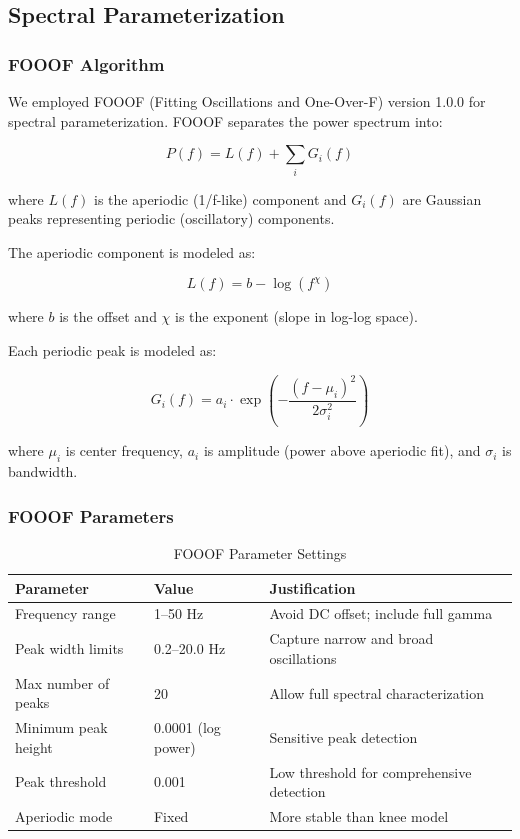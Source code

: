\documentclass[11pt,a4paper]{article}
\begin{document}
\subsection{Spectral Parameterization}

\subsubsection{FOOOF Algorithm}

We employed FOOOF (Fitting Oscillations and One-Over-F) version 1.0.0 \citep{donoghue2020} for spectral parameterization. FOOOF separates the power spectrum into:

\begin{equation}
P(f) = L(f) + \sum_{i} G_i(f)
\end{equation}

where $L(f)$ is the aperiodic (1/f-like) component and $G_i(f)$ are Gaussian peaks representing periodic (oscillatory) components.

The aperiodic component is modeled as:

\begin{equation}
L(f) = b - \log(f^\chi)
\end{equation}

where $b$ is the offset and $\chi$ is the exponent (slope in log-log space).

Each periodic peak is modeled as:

\begin{equation}
G_i(f) = a_i \cdot \exp\left(-\frac{(f - \mu_i)^2}{2\sigma_i^2}\right)
\end{equation}

where $\mu_i$ is center frequency, $a_i$ is amplitude (power above aperiodic fit), and $\sigma_i$ is bandwidth.

\subsubsection{FOOOF Parameters}

\begin{table}[H]
\centering
\caption{FOOOF Parameter Settings}
\label{tab:fooof_params}
\begin{tabular}{@{}lll@{}}
\toprule
Parameter & Value & Justification \\
\midrule
Frequency range & 1--50 Hz & Avoid DC offset; include full gamma \\
Peak width limits & 0.2--20.0 Hz & Capture narrow and broad oscillations \\
Max number of peaks & 20 & Allow full spectral characterization \\
Minimum peak height & 0.0001 (log power) & Sensitive peak detection \\
Peak threshold & 0.001 & Low threshold for comprehensive detection \\
Aperiodic mode & Fixed & More stable than knee model \\
\bottomrule
\end{tabular}
\end{table}
\end{document}
